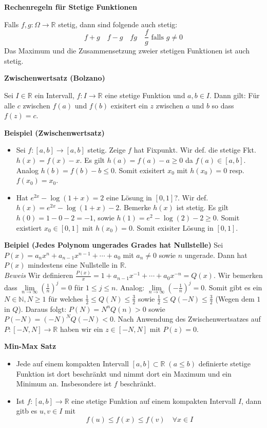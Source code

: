 \documentclass[25pt]{sciposter}
\newcommand{\limm}{\lim\limits_{n \to \infty}}
\newcommand{\R}{\mathbb{R}}
\newcommand{\N}{\mathbb{N}}
\newenvironment{method}[1]{\begin{mdframed}[backgroundcolor=blue!10,innertopmargin=15pt, innerbottommargin=15pt, nobreak=true]
		\textbf{#1 }
	}
	{ 
	\end{mdframed}
}
\begin{document}
\begin{multicols}{3}
\begin{method}{Rechenregeln für Stetige Funktionen}
Falls $f,g:\Omega \to \mathbb{R}$ stetig, dann sind folgende auch stetig:
$$f + g \quad f-g \quad fg \quad \frac{f}{g} \text{ falls } g \not = 0$$
Das Maximum und die Zusammensetzung zweier stetigen Funktionen ist auch stetig.
\end{method}


\begin{method}{ {\Large Zwischenwertsatz (Bolzano)} }
	Sei $I \in \R$ ein Intervall, $f: I \to \R$ eine stetige Funktion und $a,b \in I$. Dann gilt: Für alle $c$ zwischen $f(a)$ und $f(b)$ exisitert ein $z$ zwischen $a$ und $b$ so dass $f(z) = c$.
\end{method}

\textbf{Beispiel (Zwischenwertsatz)}
\begin{itemize}
	\item Sei $f:[a,b]\to [a,b]$ stetig. Zeige $f$ hat Fixpunkt. Wir def. die stetige Fkt. $h(x) = f(x)-x$. Es gilt $h(a) = f(a)-a \geq 0$ da $f(a) \in [a,b]$. Analog $h(b) = f(b)-b\leq 0$. Somit exisitert $x_0$ mit $h(x_0) = 0$ resp. $f(x_0) = x_0$.
	\item Hat $e^{2x} - \log (1+x) = 2$ eine Lösung in $[0,1]$?. Wir def. $h(x) = e^{2x} - \log (1+x) -2$. Bemerke $h(x)$ ist stetig. Es gilt $h(0) = 1 - 0 - 2 = -1$, sowie $h(1) = e^2 - \log(2) -2 \geq 0$. Somit existiert $x_0 \in [0,1]$ mit $h(x_0) = 0$. Somit exisiter Lösung in $[0,1]$.
\end{itemize}


\textbf{Beipiel (Jedes Polynom ungerades Grades hat Nullstelle)} Sei $P(x) = a_n x^n  + a_{n-1}x^{n-1} + \cdots + a_0$ mit $a_n \not = 0$ sowie $n$ ungerade. Dann hat $P(x)$ mindestens eine Nullstelle in $\R$.\\
\textit{Beweis} Wir definieren $\frac{P(x)}{x} = 1 + a_{n-1}x^{-1} + \cdots + a_0 x^{-n} = Q(x)$. Wir bemerken dass $\limm \left( \frac{1}{n} \right)^j = 0$ für $1\leq j \leq n$. Analog: $\limm \left( - \frac{1}{n} \right)^j = 0$. Somit gibt es ein $N \in \N, N \geq 1$ für welches $\frac{1}{2} \leq Q(N) \leq \frac{3}{2}$ sowie $\frac{1}{2} \leq Q(-N) \leq \frac{3}{2}$ (Wegen dem $1$ in $Q$). Daraus folgt: $P(N) = N^nQ(n) > 0$ sowie $P(-N) = (-N)^N Q(-N) < 0$. Nach Anwendung des Zwischenwertsatzes auf $P:[-N,N] \to \R$ haben wir ein $z \in [-N,N]$ mit $P(z) = 0$.
\begin{method}{Min-Max Satz}
\begin{itemize}
	\item  Jede auf einem kompakten Intervall $\displaystyle [a,b]\subset \mathbb {R} \;(a\leq b) $ definierte stetige Funktion ist dort beschränkt und nimmt dort ein Maximum und ein Minimum an. Insbesondere ist $f$ beschränkt.
	\item Ist ${\displaystyle f\colon [a,b]\to \mathbb {R} }$ eine stetige Funktion auf einem kompakten Intervall $I$, dann gitb es $u,v\in I$ mit $$f(u) \leq f(x) \leq f(v) \quad \forall x \in I$$
	\end{itemize}
\end{method}



\end{multicols}
\end{document}
